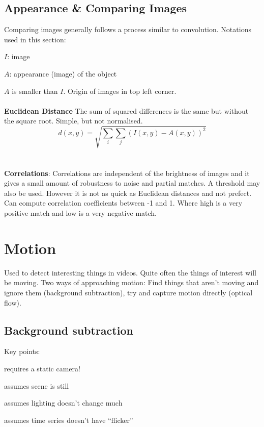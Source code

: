 \documentclass[8pt]{extarticle}
\begin{document}
\begin{multicols}{2}
\subsection{Appearance \& Comparing Images}
Comparing images generally follows a process similar to convolution. Notations used in this section:
\begin{compactitem}
    \item $I$: image
    \item $A$: appearance (image) of the object
\end{compactitem}
$A$ is smaller than $I$. Origin of images in top left corner.
\\ \\
\textbf{Euclidean Distance}
The sum of squared differences is the same but without the square root. Simple, but not normalised.
\begin{equation}
    d(x,y) = \sqrt{\sum\limits_{i}\sum\limits_{j} (I(x,y) - A(x,y))^2}
\end{equation}
\\ \\
\textbf{Correlations}:
Correlations are independent of the brightness of images and it gives a small amount of robustness to noise and partial matches. A threshold may also be used. However it is not as quick as Euclidean distances and not prefect. Can compute correlation coefficients between -1 and 1. Where high is a very positive match and low is a very negative match.

\section{Motion}
Used to detect interesting things in videos. Quite often the things of interest will be moving. Two ways of approaching motion: Find things that aren't moving and ignore them (background subtraction), try and capture motion directly (optical flow).

\subsection{Background subtraction}
Key points:
\begin{compactitem}
    \item requires a static camera!
    \item assumes scene is still
    \item assumes lighting doesn't change much
    \item assumes time series doesn't have ``flicker''
\end{compactitem}


\end{multicols}
\end{document}
